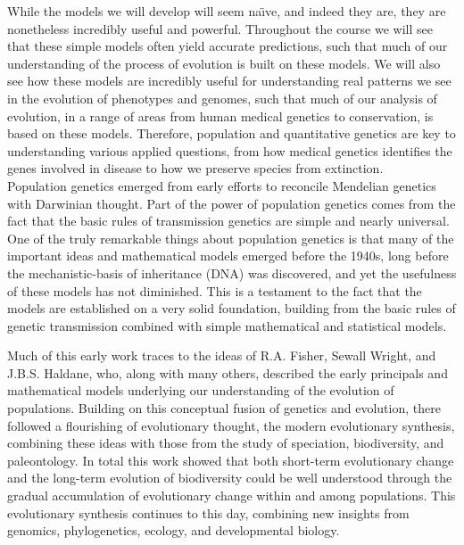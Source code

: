 
While the models we will develop will seem na\"{\i}ve, and indeed they are, they are
nonetheless incredibly useful and powerful. Throughout the course we will see
that these simple models often yield accurate predictions, such that much of our
understanding of the process of evolution is built on these models. We will
also see how these models are incredibly useful for understanding real patterns
we see in the evolution of phenotypes and genomes, such that much of our
analysis of evolution, in a range of areas from human medical genetics to conservation,
is based on these models. Therefore, population and quantitative genetics are key to
understanding various applied questions, from how medical genetics identifies
the genes involved in disease to how we preserve species from extinction. \\

Population genetics emerged from early efforts to
reconcile Mendelian genetics with Darwinian thought.
Part of the power of
population genetics comes from the fact that the basic rules of
transmission genetics are simple and nearly universal.  One of the truly remarkable things about population genetics is that
many of the important ideas and mathematical models emerged before the
1940s, long before the
mechanistic-basis of inheritance (DNA) was discovered, and yet the
usefulness of these models has not diminished. This is a testament to
the fact that the models are established on a very solid foundation,
building from the basic rules of genetic transmission combined with
simple mathematical and statistical models.

Much of this early work traces to the ideas of R.A. Fisher, Sewall Wright, and J.B.S. Haldane, who, along with many others, described the early principals and mathematical models underlying our understanding of the evolution of populations. Building on this conceptual fusion of genetics and evolution, there followed a flourishing of evolutionary thought, the modern evolutionary synthesis, combining these ideas with those from the study of speciation, biodiversity, and paleontology. In total this work showed that both short-term evolutionary change and the long-term evolution of biodiversity could be well understood through the gradual accumulation of evolutionary change within and among populations. This evolutionary synthesis continues to this day, combining new insights from genomics, phylogenetics, ecology, and developmental biology.

